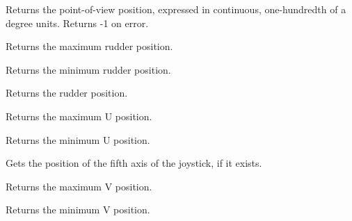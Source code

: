 \label{wxjoystickgetpovctsposition}


Returns the point-of-view position, expressed in continuous, one-hundredth of a degree units.
Returns -1 on error.

\label{wxjoystickgetruddermax}


Returns the maximum rudder position.

\label{wxjoystickgetruddermin}


Returns the minimum rudder position.

\label{wxjoystickgetrudderposition}


Returns the rudder position.

\label{wxjoystickgetumax}


Returns the maximum U position.

\label{wxjoystickgetumin}


Returns the minimum U position.

\label{wxjoystickgetuposition}


Gets the position of the fifth axis of the joystick, if it exists.

\label{wxjoystickgetvmax}


Returns the maximum V position.

\label{wxjoystickgetvmin}


Returns the minimum V position.

\label{wxjoystickgetvposition}


